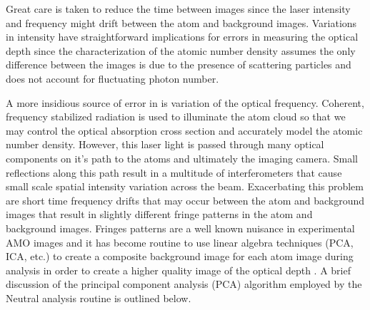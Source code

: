 Great care is taken to reduce the time between images since the laser intensity and frequency might drift between the atom and background images. 
Variations in intensity have straightforward implications for errors in measuring the optical depth since the characterization of the atomic number density assumes the only difference between the images is due to the presence of scattering particles and does not account for fluctuating photon number. 

A more insidious source of error in is variation of the optical frequency. 
Coherent, frequency stabilized radiation is used to illuminate the atom cloud so that we may control the optical absorption cross section and accurately model the atomic number density. 
However, this laser light is passed through many optical components on it's path to the atoms and ultimately the imaging camera. 
Small reflections along this path result in a multitude of interferometers that cause small scale spatial intensity variation across the beam. 
Exacerbating this problem are short time frequency drifts that may occur between the atom and background images that result in slightly different fringe patterns in the atom and background images. 
Fringes patterns are a well known nuisance in experimental AMO images and it has become routine to use linear algebra techniques (PCA, ICA, etc.) to create a composite background image for each atom image during analysis in order to create a higher quality image of the optical depth \cite{Segal2009}.
A brief discussion of the principal component analysis (PCA) algorithm employed by the Neutral analysis routine is outlined below.

